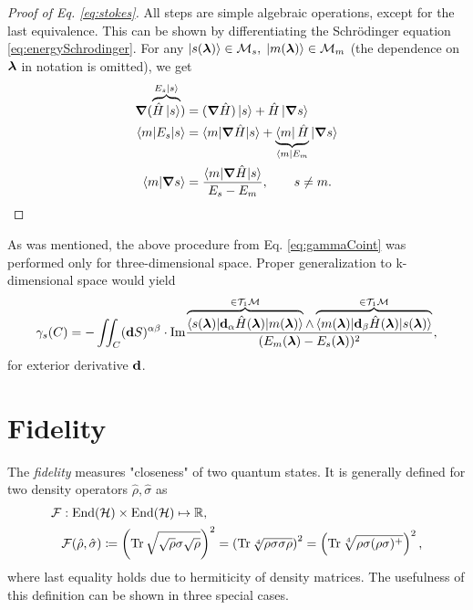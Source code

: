 \begin{proof}[Proof of Eq. \ref{eq:stokes}]
 All steps are simple algebraic operations, except for the last equivalence. This can be shown by differentiating the Schr\"odinger equation \ref{eq:energySchrodinger}. For any $\ket{s({\bm\lambda})}\in \mathcal{M}_s,\;\ket{m({\bm\lambda})}\in \mathcal{M}_m$ (the dependence on ${\bm\lambda}$ in notation is omitted), we get
\begin{equation}
    \begin{split}
        \bm \nabla (\overbrace{\hat{H}\ket{s}}^{E_s\ket{s}})&= (\bm\nabla \hat{H})\ket{s} +\hat{H} \ket{\bm \nabla s}\\
        \braket{m|E_s|s}&= \braket{m|\bm \nabla \hat{H}| s}+ \underbrace{\bra{m} \hat{H}}_{\bra{m} E_m} |\bm\nabla s\rangle \\
        \braket{m|\bm \nabla s}&=
        \frac{\braket{m|\bm \nabla \hat{H} |s}}
        { E_s-E_m}, \qquad s\neq m.
    \end{split}
    \label{eq:mgradn_proof}
\end{equation}

\end{proof} 

As was mentioned, the above procedure from Eq. \ref{eq:gammaCoint} was performed only for three-dimensional space. Proper generalization to k-dimensional space would yield
\begin{equation}
    \gamma_s(C) = -\iint_C (\bm{\mathrm{d}} S)^{\alpha\beta} \cdot\textrm{Im} \frac{
        \overbrace{\braket{s({\bm\lambda})|\bm{\mathrm{d}}_\alpha \hat{H}({\bm\lambda}) |m({\bm\lambda})}}^{\in\mathcal{T}_1\mathcal{M}}\wedge \overbrace{\braket{m({\bm\lambda})|\bm{\mathrm{d}}_\beta\hat{H}({\bm\lambda})|s({\bm\lambda})}}^{\in\mathcal{T}_1\mathcal{M}}    
    }{
        (E_m({\bm\lambda})-E_s({\bm\lambda}))^2
    },
    \label{eq:mgrads}
\end{equation}
for exterior derivative $\bm{\mathrm{d}}$.
                
                
                



\section{Fidelity}
The \emph{fidelity} measures "closeness" of two quantum states. It is generally defined for two density operators $\hat\rho, \hat\sigma$ as
\begin{equation}
    \begin{split}
        \mathcal F&: \operatorname{End}(\mathcal{H})\times \operatorname{End}(\mathcal{H})\mapsto \mathbb{R}, \\
        &\mathcal F(\hat\rho,\hat\sigma)\coloneqq \left(\operatorname{\textrm{Tr}} \sqrt{\sqrt{\rho}\sigma\sqrt{\rho}}\right)^2 = \left(\operatorname{\textrm{Tr}}\sqrt[4]{\rho \sigma \sigma \rho}\right)^2= \left(\operatorname{\textrm{Tr}}\sqrt[4]{\rho \sigma (\rho\sigma)^+ }\right)^2,
    \end{split}
    \label{eq:fidelitydef}
\end{equation}
where last equality holds due to hermiticity of density matrices.
The usefulness of this definition can be shown in three special cases.

